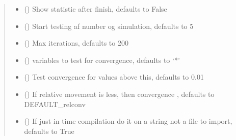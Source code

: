 \documentclass[letterpaper,10pt,english]{sphinxmanual}
\begin{document}
\begin{fulllineitems}
\begin{fulllineitems}
\begin{quote}
\begin{description}
\begin{itemize}
\item {} 
\sphinxAtStartPar
{} (\sphinxstyleliteralemphasis{\sphinxupquote{, }}) \textendash{} Show statistic after finish, defaults to False

\item {} 
\sphinxAtStartPar
{} (\sphinxstyleliteralemphasis{\sphinxupquote{, }}) \textendash{} Start testing af number og simulation, defaults to 5

\item {} 
\sphinxAtStartPar
{} (\sphinxstyleliteralemphasis{\sphinxupquote{, }}) \textendash{} Max iterations, defaults to 200

\item {} 
\sphinxAtStartPar
{} (\sphinxstyleliteralemphasis{\sphinxupquote{, }}) \textendash{} variables to test for convergence, defaults to ‘*’

\item {} 
\sphinxAtStartPar
{} (\sphinxstyleliteralemphasis{\sphinxupquote{, }}) \textendash{} Test convergence for values above this, defaults to 0.01

\item {} 
\sphinxAtStartPar
{} (\sphinxstyleliteralemphasis{\sphinxupquote{, }}) \textendash{} If relative movement is less, then convergence , defaults to DEFAULT\_relconv

\item {} 
\sphinxAtStartPar
{} (\sphinxstyleliteralemphasis{\sphinxupquote{, }}) \textendash{} If just in time compilation do it on a string not a file to import, defaults to True


\end{itemize}
\end{description}
\end{quote}
\end{fulllineitems}
\end{fulllineitems}
\end{document}
